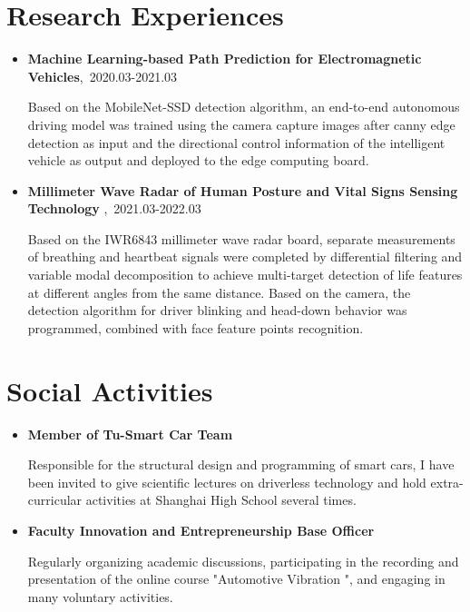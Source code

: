 \documentclass{resume}
\begin{document}
\section{Research Experiences}
\begin{itemize}[parsep=0.2ex]
  \item \textbf{Machine Learning-based Path Prediction for Electromagnetic Vehicles},\ 2020.03-2021.03  \par
Based on the MobileNet-SSD detection algorithm, an end-to-end autonomous driving model was trained using the camera capture images after canny edge detection as input and the directional control information of the intelligent vehicle as output and deployed to the edge computing board.

  \item \textbf{Millimeter Wave Radar of Human Posture and Vital Signs Sensing Technology },\ 2021.03-2022.03  \par
Based on the IWR6843 millimeter wave radar board, separate measurements of breathing and heartbeat signals were completed 
by differential filtering and variable modal decomposition to achieve multi-target detection of life features at different angles from the same distance. Based on the camera, the detection algorithm for driver blinking and head-down behavior was programmed, combined with face feature points recognition. 
\end{itemize}


\section{Social Activities}
\begin{itemize}[parsep=0.2ex]
  \item \textbf{Member of Tu-Smart Car Team}  \par
Responsible for the structural design and programming of smart cars, I have been invited to give scientific lectures on
driverless technology and hold extra-curricular activities at Shanghai High School several times.

 \item  \textbf{Faculty Innovation and Entrepreneurship Base Officer} \par
Regularly organizing academic discussions, participating in the recording and presentation of the online course "Automotive
Vibration ", and engaging in many voluntary activities.

\end{itemize}

%
%
\end{document}
